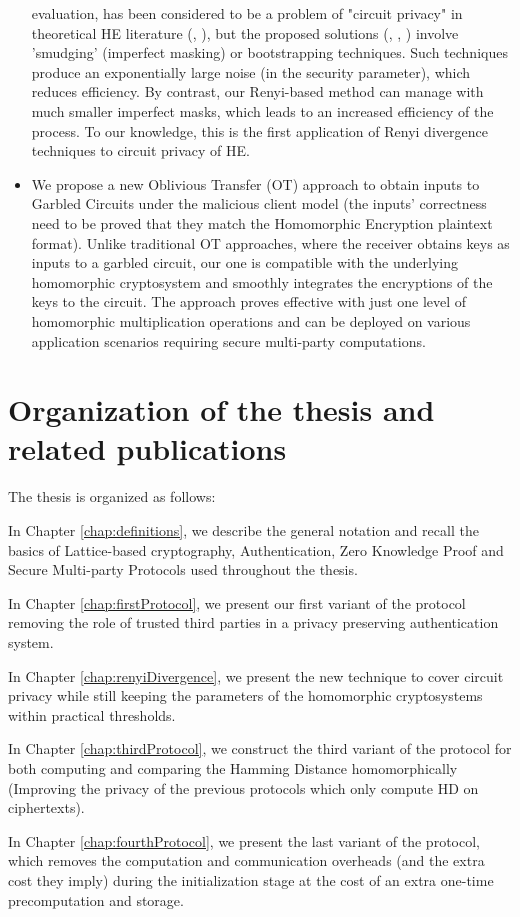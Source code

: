 \begin{itemize}
  evaluation, has been considered to be a problem of "circuit privacy" in theoretical HE
  literature (\cite{sander1999non}, \cite{ishai2007evaluating}), but the
  proposed solutions (\cite{homenc}, \cite{ostrovsky2014maliciously},
  \cite{gentry2010hop}) involve 'smudging' (imperfect masking) or bootstrapping
  techniques. Such techniques produce an exponentially large noise (in the security parameter), which
  reduces efficiency. By contrast, our Renyi-based method can manage with much smaller
  imperfect masks, which leads to an increased efficiency of the process. To our knowledge, this is the first application of
  Renyi divergence techniques to circuit privacy of HE.
\item We propose a new Oblivious Transfer (OT) approach to obtain inputs to
  Garbled Circuits under the malicious client model (the inputs' correctness need to be proved that they match the Homomorphic Encryption plaintext format). Unlike traditional OT approaches, where the receiver obtains
  keys as inputs to a garbled circuit, our one is compatible with the
  underlying homomorphic cryptosystem and smoothly integrates the encryptions of the
  keys to the circuit. The approach proves effective with just one level of
  homomorphic multiplication operations and can be deployed on various application
  scenarios requiring secure multi-party computations.
\end{itemize}

\section{Organization of the thesis and related publications}
The thesis is organized as follows:
\begin{description}
\item In Chapter \ref{chap:definitions}, we describe the general notation and
  recall the basics of Lattice-based cryptography, Authentication, Zero
  Knowledge Proof and Secure Multi-party Protocols used throughout the
  thesis.
\item In Chapter \ref{chap:firstProtocol}, we present our first variant of the
  protocol removing the role of trusted third parties in a privacy
  preserving authentication system.
\item In Chapter \ref{chap:renyiDivergence}, we present the new technique to
  cover circuit privacy while still keeping the parameters of the homomorphic
  cryptosystems within practical thresholds.
\item In Chapter \ref{chap:thirdProtocol}, we construct the third variant of the
  protocol for both computing and comparing the Hamming Distance
  homomorphically (Improving the privacy of the previous protocols which only compute HD on ciphertexts).
\item In Chapter \ref{chap:fourthProtocol}, we present the last variant of the
  protocol, which removes the computation and communication overheads (and the
  extra cost they imply) during the initialization stage at the cost of an extra one-time precomputation and storage.
\end{description}
\label{sec:introOrganize}

